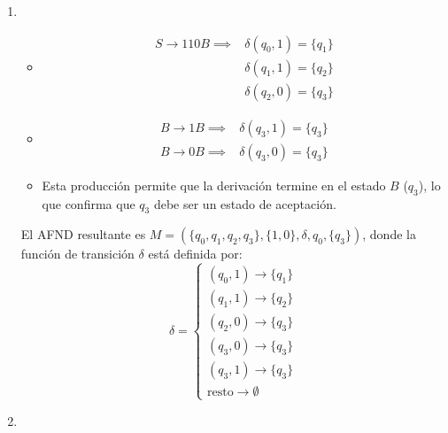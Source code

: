 \begin{solucion}
\begin{enumerate}
    \item {}
    \begin{itemize}
        \item {}
        \begin{align*}
        S \to 110B \implies & \delta(q_0, 1) = \{q_1\} \\
        & \delta(q_1, 1) = \{q_2\} \\
        & \delta(q_2, 0) = \{q_3\}
        \end{align*}
        \item {}
        \begin{align*}
        B \to 1B \implies & \delta(q_3, 1) = \{q_3\} \\
        B \to 0B \implies & \delta(q_3, 0) = \{q_3\}
        \end{align*}
        \item {}
        Esta producción permite que la derivación termine en el estado $B$ ($q_3$), lo que confirma que $q_3$ debe ser un estado de aceptación.
    \end{itemize}

    El AFND resultante es $M = (\{q_0, q_1, q_2, q_3\}, \{1, 0\}, \delta, q_0, \{q_3\})$, donde la función de transición $\delta$ está definida por:
    $$
    \delta = 
    \begin{cases}
    (q_0, 1) \to \{q_1\} \\
    (q_1, 1) \to \{q_2\} \\
    (q_2, 0) \to \{q_3\} \\
    (q_3, 0) \to \{q_3\} \\
    (q_3, 1) \to \{q_3\} \\
    \text{resto} \to \emptyset
    \end{cases}
    $$

    \item {}
    \begin{center}
\end{center}
\end{enumerate}
\end{solucion}

